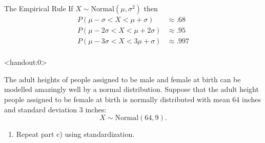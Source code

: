 \begin{frame}
  \begin{block}{The Empirical Rule}
    If $X \sim \mbox{Normal}(\mu,\sigma^2)$ then
    \begin{align*}
      P(\mu-\sigma < X < \mu + \sigma) & \approx .68\\
      P(\mu-2\sigma < X < \mu + 2\sigma) & \approx .95\\
      P(\mu-3\sigma < X < 3\mu + \sigma) & \approx .997\\
    \end{align*}
  \end{block}
\end{frame}

\begin{frame}<handout:0>
  \begin{block}{\examplectd}
    The adult heights of people assigned to be male and female at birth can be modelled amazingly well by a normal distribution. Suppose that the adult height people assigned to be female at birth is normally distributed with mean 64 inches and standard deviation 3 inches:
    \[
      X \sim \mbox{Normal}(64,9).
    \]
    
    \begin{enumerate}[label=\alph*),start=5]
    \item Repeat part c) using standardization.
    \end{enumerate}
  \end{block}
\end{frame}

% 
%     
% 
% 



% 
%   

